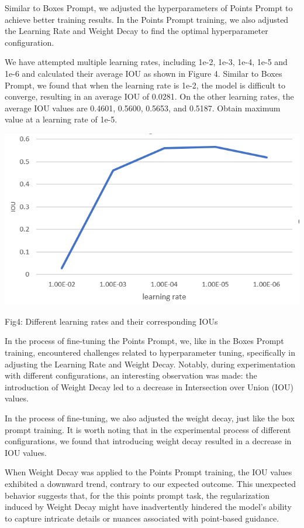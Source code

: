 \documentclass[12pt, a4paper, oneside]{article}
\begin{document}
Similar to Boxes Prompt, we adjusted the hyperparameters of Points Prompt to achieve better training results. In the Points Prompt training, we also adjusted the Learning Rate and Weight Decay to find the optimal hyperparameter configuration.

We have attempted multiple learning rates, including 1e-2, 1e-3, 1e-4, 1e-5 and 1e-6 and calculated their average IOU as shown in Figure 4. Similar to Boxes Prompt, we found that when the learning rate is 1e-2, the model is difficult to converge, resulting in an average IOU of 0.0281. On the other learning rates, the average IOU values are 0.4601, 0.5600, 0.5653, and 0.5187. Obtain maximum value at a learning rate of 1e-5.

\begin{center}
\includegraphics[width=1\textwidth]{3.png}
\caption{Fig4: Different learning rates and their corresponding IOUs}
\end{center}

In the process of fine-tuning the Points Prompt, we, like in the Boxes Prompt training, encountered challenges related to hyperparameter tuning, specifically in adjusting the Learning Rate and Weight Decay. Notably, during experimentation with different configurations, an interesting observation was made: the introduction of Weight Decay led to a decrease in Intersection over Union (IOU) values.

In the process of fine-tuning, we also adjusted the weight decay, just like the box prompt training. It is worth noting that in the experimental process of different configurations, we found that introducing weight decay resulted in a decrease in IOU values.

When Weight Decay was applied to the Points Prompt training, the IOU values exhibited a downward trend, contrary to our expected outcome. This unexpected behavior suggests that, for the this points prompt task, the regularization induced by Weight Decay might have inadvertently hindered the model's ability to capture intricate details or nuances associated with point-based guidance.
\end{document}

